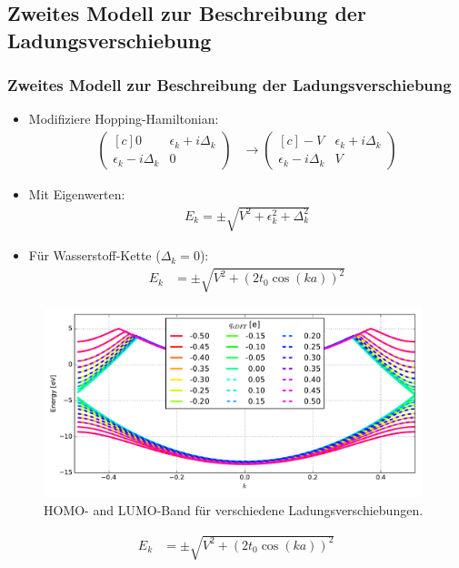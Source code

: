\subsection{Zweites Modell zur Beschreibung der Ladungsverschiebung}
\begin{frame}
\frametitle{Zweites Modell zur Beschreibung der Ladungsverschiebung}
\begin{itemize}
\setlength{\itemsep}{.5cm}
\item Modifiziere Hopping-Hamiltonian:
\begin{align*}
\begin{pmatrix*}[c]
0 & \epsilon_k + i \Delta_k \\
\epsilon_k - i \Delta_k & 0
\end{pmatrix*} 
&\to 
\begin{pmatrix*}[c]
-V & \epsilon_k + i \Delta_k \\
\epsilon_k - i \Delta_k & V
\end{pmatrix*}
\end{align*}
\item Mit Eigenwerten:
\begin{align*}
E_k = \pm \sqrt{V^2+\epsilon_k^2+\Delta_k^2}
\end{align*}
\item Für Wasserstoff-Kette ($\Delta_k = 0$):
\begin{align*}
E_k &= \pm \sqrt{V^2 + \left(2t_0\cos(ka)\right)^2}
\end{align*}
\end{itemize}
\end{frame}

\begin{frame}
\begin{figure}
\centering
\includegraphics[width = 11cm]{Images/Hydrogen/charging/band_structure_q_1}
\caption{HOMO- and LUMO-Band für verschiedene Ladungsverschiebungen.}
\label{image_hydrogen_charged_bands}
\end{figure}
\begin{align*}
E_k &= \pm \sqrt{V^2 + \left(2t_0\cos(ka)\right)^2}
\end{align*}
\end{frame}

